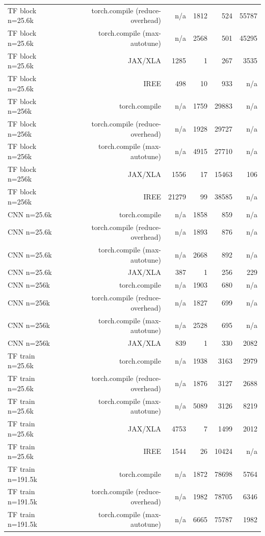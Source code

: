 \begin{tabular}{lrrrrr}
TF block n=25.6k & torch.compile (reduce-overhead) & n/a & 1812 & 524 & 55787 \\
TF block n=25.6k & torch.compile (max-autotune) & n/a & 2568 & 501 & 45295 \\
TF block n=25.6k & JAX/XLA & 1285 & 1 & 267 & 3535 \\
TF block n=25.6k & IREE & 498 & 10 & 933 & n/a \\
TF block n=256k & torch.compile & n/a & 1759 & 29883 & n/a \\
TF block n=256k & torch.compile (reduce-overhead) & n/a & 1928 & 29727 & n/a \\
TF block n=256k & torch.compile (max-autotune) & n/a & 4915 & 27710 & n/a \\
TF block n=256k & JAX/XLA & 1556 & 17 & 15463 & 106 \\
TF block n=256k & IREE & 21279 & 99 & 38585 & n/a \\
CNN n=25.6k & torch.compile & n/a & 1858 & 859 & n/a \\
CNN n=25.6k & torch.compile (reduce-overhead) & n/a & 1893 & 876 & n/a \\
CNN n=25.6k & torch.compile (max-autotune) & n/a & 2668 & 892 & n/a \\
CNN n=25.6k & JAX/XLA & 387 & 1 & 256 & 229 \\
CNN n=256k & torch.compile & n/a & 1903 & 680 & n/a \\
CNN n=256k & torch.compile (reduce-overhead) & n/a & 1827 & 699 & n/a \\
CNN n=256k & torch.compile (max-autotune) & n/a & 2528 & 695 & n/a \\
CNN n=256k & JAX/XLA & 839 & 1 & 330 & 2082 \\
TF train n=25.6k & torch.compile & n/a & 1938 & 3163 & 2979 \\
TF train n=25.6k & torch.compile (reduce-overhead) & n/a & 1876 & 3127 & 2688 \\
TF train n=25.6k & torch.compile (max-autotune) & n/a & 5089 & 3126 & 8219 \\
TF train n=25.6k & JAX/XLA & 4753 & 7 & 1499 & 2012 \\
TF train n=25.6k & IREE & 1544 & 26 & 10424 & n/a \\
TF train n=191.5k & torch.compile & n/a & 1872 & 78698 & 5764 \\
TF train n=191.5k & torch.compile (reduce-overhead) & n/a & 1982 & 78705 & 6346 \\
TF train n=191.5k & torch.compile (max-autotune) & n/a & 6665 & 75787 & 1982 \\

\end{tabular}
